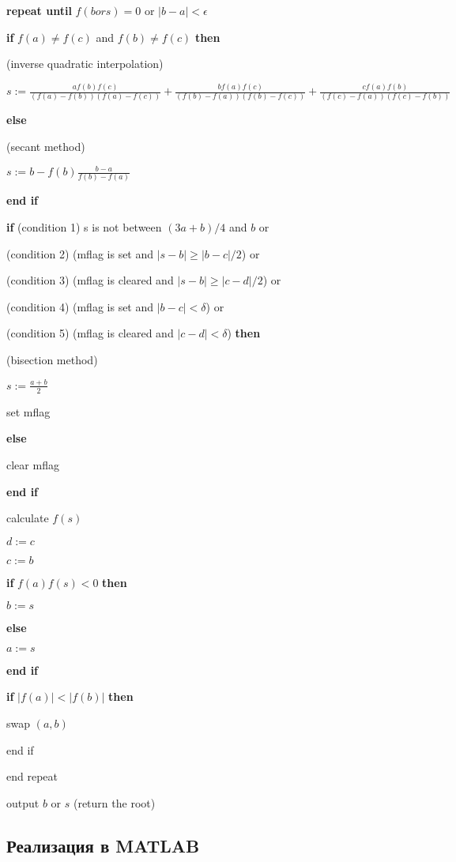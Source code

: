 \documentclass[a4paper,12pt]{article}
\begin{document}
\textbf{repeat until} $f(b or s) = 0$ or $|b - a| < \epsilon$

\quad 
\textbf{if} $f(a) \neq f(c)$ and $f(b) \neq f(c)$ 
\textbf{then}

\quad \quad(inverse quadratic interpolation)

\quad\quad$ s:={\frac {af(b)f(c)}{(f(a)-f(b))(f(a)-f(c))}}+{\frac {bf(a)f(c)}{(f(b)-f(a))(f(b)-f(c))}}+{\frac {cf(a)f(b)}{(f(c)-f(a))(f(c)-f(b))}}$ 

\quad 
\textbf{else}

\quad \quad(secant method)

\quad \quad$s:=b-f(b){\frac {b-a}{f(b)-f(a)}}$ 


\quad 
\textbf{end if}

\quad 
\textbf{if} (condition 1) s is not between $ (3a+b)/4$ and $b$ or

\quad(condition 2) (mflag is set and $|s-b| \geq |b-c|/2$) or

\quad(condition 3) (mflag is cleared and  $|s-b| \geq |c-d|/2$) or

\quad(condition 4) (mflag is set and  $|b-c| < \delta$) or

\quad(condition 5) (mflag is cleared and  $|c-d| < \delta$) 
\textbf{then}

\quad \quad (bisection method)

\quad\quad$s:=\frac {a+b}{2}$

\quad\quad set mflag

\quad 
\textbf{else}

\quad\quad clear mflag

\quad 
\textbf{end if}

\quad calculate $f(s)$

\quad$d := c$ 

\quad$c := b$

\quad 
\textbf{if} $f(a)f(s) < 0$ 
\textbf{then}

\quad\quad $b := s $

\quad 
\textbf{else}

\quad\quad $a := s $

\quad 
\textbf{end if}

\quad 
\textbf{if} $|f(a)| < |f(b)|$ 
\textbf{then}

\quad\quad swap $(a,b) $

\quad end if

end repeat

output $b$ or $s$ (return the root)

\subsection*{Реализация в MATLAB}
\end{document}
